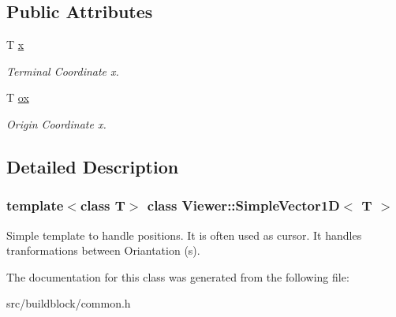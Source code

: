 \subsection*{Public Attributes}
\begin{DoxyCompactItemize}
\item 
\mbox{\label{classViewer_1_1SimpleVector1D_a62759b3724abab5ce8ff8d27a56edff6}} 
T \mbox{\hyperlink{classViewer_1_1SimpleVector1D_a62759b3724abab5ce8ff8d27a56edff6}{x}}
\begin{DoxyCompactList}\small\item\em Terminal Coordinate x. \end{DoxyCompactList}\item 
\mbox{\label{classViewer_1_1SimpleVector1D_ac1aa32ecf8bf68483fa1dd9315fc5dbe}} 
T \mbox{\hyperlink{classViewer_1_1SimpleVector1D_ac1aa32ecf8bf68483fa1dd9315fc5dbe}{ox}}
\begin{DoxyCompactList}\small\item\em Origin Coordinate x. \end{DoxyCompactList}\end{DoxyCompactItemize}


\subsection{Detailed Description}
\subsubsection*{template$<$class T$>$\newline
class Viewer\+::\+Simple\+Vector1\+D$<$ T $>$}

Simple template to handle positions. It is often used as cursor. It handles tranformations between Oriantation (s). 

The documentation for this class was generated from the following file\+:\begin{DoxyCompactItemize}
\item 
src/buildblock/common.\+h\end{DoxyCompactItemize}
